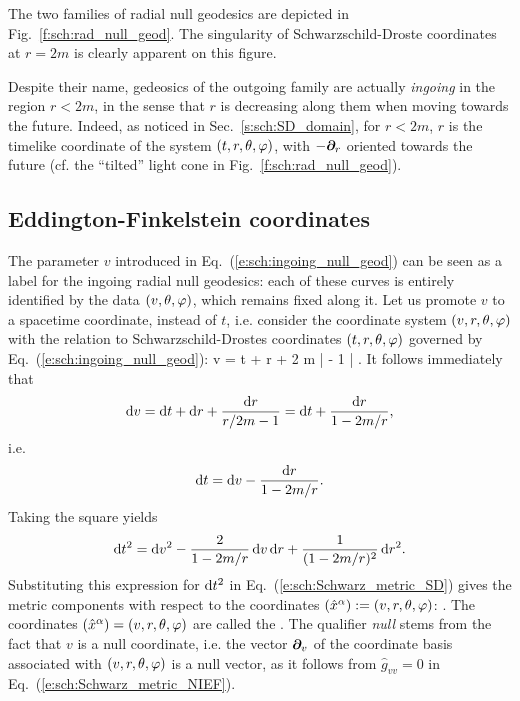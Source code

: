 The two families of radial null geodesics are depicted in
Fig.~\ref{f:sch:rad_null_geod}.
The singularity of Schwarzschild-Droste coordinates at $r=2m$
is clearly apparent on this figure.


\begin{remark}
Despite their name, gedeosics of the outgoing family are actually
\emph{ingoing} in the region $r<2m$, in the sense that
$r$ is decreasing along them when moving towards the future. Indeed,
as noticed in Sec.~\ref{s:sch:SD_domain},
for $r<2m$, $r$ is the timelike coordinate of the system $(t,r,\theta,\varphi)$,
with $-\bm{\partial}_r$ oriented towards the future (cf. the ``tilted'' light cone
in Fig.~\ref{f:sch:rad_null_geod}).
\end{remark}

\subsection{Eddington-Finkelstein coordinates}

The parameter $v$ introduced in Eq.~(\ref{e:sch:ingoing_null_geod}) can be
seen as a label for the ingoing radial null geodesics: each of these curves is
entirely identified by the data $(v,\theta,\varphi)$, which remains fixed along it.
Let us promote $v$ to a spacetime coordinate, instead of $t$, i.e.
consider the coordinate system $(v,r,\theta,\varphi)$ with the relation to
Schwarzschild-Drostes coordinates $(t,r,\theta,\varphi)$ governed by Eq.~(\ref{e:sch:ingoing_null_geod}):
\be \label{e:sch:v_t_r}
     v = t + r + 2 m \ln \left|  - 1 \right| .
\ee
It follows immediately that
\[
    \mathrm{d} v = \mathrm{d} t + \mathrm{d} r + \frac{\mathrm{d} r}{r/2m - 1} = \mathrm{d} t + \frac{\mathrm{d} r}{1 - 2m/r} ,
\]
i.e.
\[
    \mathrm{d} t = \mathrm{d} v -  \frac{\mathrm{d} r}{1 - 2m/r} .
\]
Taking the square yields
\[
    \mathrm{d} t^2 = \mathrm{d} v^2 - \frac{2}{1 - 2m/r} \, \mathrm{d} v \, \mathrm{d} r + \frac{1}{(1 - 2m/r)^2}\, \mathrm{d} r^2 .
\]
Substituting this expression for $\mathrm{d} t^2$ in Eq.~(\ref{e:sch:Schwarz_metric_SD})
gives the metric components with respect to the coordinates
$({\hat x}^\alpha) := (v,r,\theta,\varphi)$:
\be \label{e:sch:Schwarz_metric_NIEF}
    .
\ee
The coordinates $({\hat x}^\alpha) = (v,r,\theta,\varphi)$ are called the
. The qualifier \emph{null} stems from the fact that
$v$ is a null coordinate, i.e. the vector $\bm{\partial}_v$ of the coordinate
basis associated with $(v,r,\theta,\varphi)$ is a null
vector, as it follows from ${\hat g}_{vv}=0$ in Eq.~(\ref{e:sch:Schwarz_metric_NIEF}).

